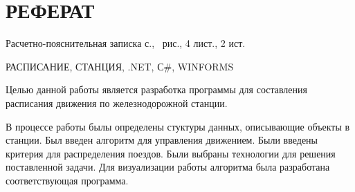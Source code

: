\section*{\centering РЕФЕРАТ}
\setcounter{page}{2}

Расчетно-пояснительная записка \pageref{LastPage} с., \totalfigures\ рис., 4 лист., 2 ист.

РАСПИСАНИЕ, СТАНЦИЯ, .NET, С\#, WINFORMS

Целью данной работы является разработка программы для составления расписания движения по железнодорожной станции.

В процессе работы былы определены стуктуры данных, описывающие объекты в станции.
Был введен алгоритм для управления движением.
Были введены критерия для распределения поездов.
Были выбраны технологии для решения поставленной задачи.
Для визуализации работы алгоритма была разработана соответствующая программа.

